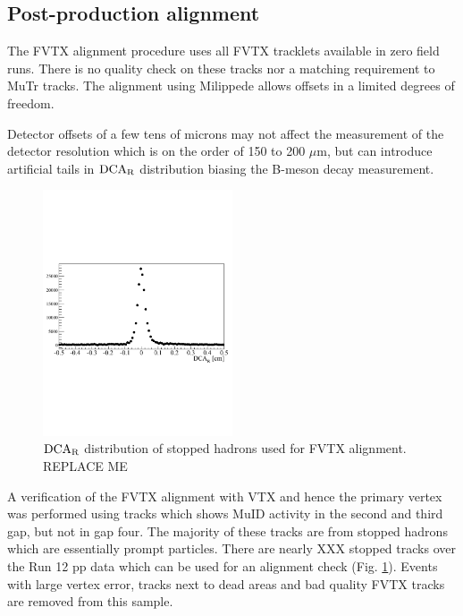 \documentclass[12pt]{article}
\newcommand{\dcar}{$\rm{DCA}_{R}$ }
\begin{document}
\pagebreak
\newpage


\subsection{Post-production alignment}
\label{sec:postprod_alignment}

The FVTX alignment procedure uses all FVTX tracklets available in zero field runs. There is no quality check on these tracks nor a matching requirement to MuTr tracks. 
The alignment using Milippede allows offsets in a limited degrees of freedom.

Detector offsets of a few tens of microns may not affect the measurement of the detector resolution which is on the order of 150 to 200 $\mu$m, 
but can introduce artificial tails in \dcar distribution biasing the B-meson decay measurement. 

\begin{figure}
\begin{center}
	\includegraphics[width=0.5\textwidth]{Figures/dca_hadrons}
	\caption{\label{fig:dca_hadrons}\dcar distribution of stopped hadrons used for FVTX alignment. {\color{red} REPLACE ME}}
\end{center}
\end{figure}

A verification of the FVTX alignment with VTX and hence the primary vertex was performed using tracks which shows MuID activity in the second and third gap, but 
not in gap four. The majority of these tracks are from stopped hadrons which are essentially prompt particles. There are nearly {\color{red} XXX} stopped tracks over the Run 12 pp
 data which can be used for an alignment check (Fig. \ref{fig:dca_hadrons}). Events with large vertex error, tracks next to dead areas and bad quality FVTX tracks 
 are removed from this sample.
\end{document}
